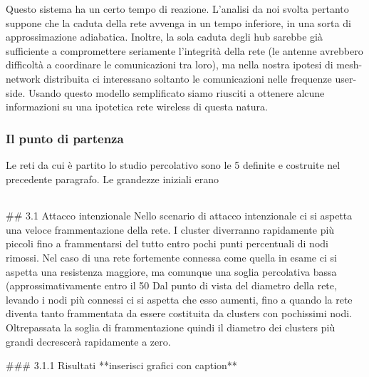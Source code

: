 Questo sistema ha un certo tempo di reazione. L'analisi da noi svolta pertanto suppone che la caduta della rete avvenga in un tempo inferiore, in una sorta di approssimazione adiabatica. Inoltre, la sola caduta degli hub sarebbe già sufficiente a compromettere seriamente l'integrità della rete (le antenne avrebbero difficoltà a coordinare le comunicazioni tra loro), ma nella nostra ipotesi di mesh-network distribuita ci interessano soltanto le comunicazioni nelle frequenze user-side. Usando questo modello semplificato siamo riusciti a ottenere alcune informazioni su una ipotetica rete wireless di questa natura.

\subsubsection*{Il punto di partenza}
Le reti da cui è partito lo studio percolativo sono le 5 definite e costruite nel precedente paragrafo. Le grandezze iniziali erano
\begin{table}
 \begin{tabular}{cccccccccccccccccc}
  
 \end{tabular}

\end{table}


## 3.1 Attacco intenzionale
Nello scenario di attacco intenzionale ci si aspetta una veloce frammentazione della rete. I cluster diverranno rapidamente più piccoli fino a frammentarsi del tutto entro pochi punti percentuali di nodi rimossi. Nel caso di una rete fortemente connessa come quella in esame ci si aspetta una resistenza maggiore, ma comunque una soglia percolativa bassa (approssimativamente entro il 50%
Dal punto di vista del diametro della rete, levando i nodi più connessi ci si aspetta che esso aumenti, fino a quando la rete diventa tanto frammentata da essere costituita da clusters con pochissimi nodi. Oltrepassata la soglia di frammentazione quindi il diametro dei clusters più grandi decrescerà rapidamente a zero.

### 3.1.1 Risultati
**inserisci grafici con caption**

